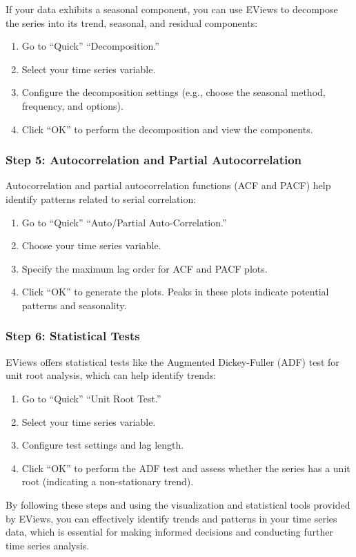 \documentclass[
  letterpaper,
  DIV=11,
  numbers=noendperiod]{scrartcl}
\begin{document}
If your data exhibits a seasonal component, you can use EViews to
decompose the series into its trend, seasonal, and residual components:

\begin{enumerate}
\def\labelenumi{\arabic{enumi}.}
\item
  Go to ``Quick'' ``Decomposition.''
\item
  Select your time series variable.
\item
  Configure the decomposition settings (e.g., choose the seasonal
  method, frequency, and options).
\item
  Click ``OK'' to perform the decomposition and view the components.
\end{enumerate}

\hypertarget{step-5-autocorrelation-and-partial-autocorrelation}{%
\subsubsection{\texorpdfstring{\textbf{Step 5: Autocorrelation and
Partial
Autocorrelation}}{Step 5: Autocorrelation and Partial Autocorrelation}}\label{step-5-autocorrelation-and-partial-autocorrelation}}

Autocorrelation and partial autocorrelation functions (ACF and PACF)
help identify patterns related to serial correlation:

\begin{enumerate}
\def\labelenumi{\arabic{enumi}.}
\item
  Go to ``Quick'' ``Auto/Partial Auto-Correlation.''
\item
  Choose your time series variable.
\item
  Specify the maximum lag order for ACF and PACF plots.
\item
  Click ``OK'' to generate the plots. Peaks in these plots indicate
  potential patterns and seasonality.
\end{enumerate}

\hypertarget{step-6-statistical-tests}{%
\subsubsection{\texorpdfstring{\textbf{Step 6: Statistical
Tests}}{Step 6: Statistical Tests}}\label{step-6-statistical-tests}}

EViews offers statistical tests like the Augmented Dickey-Fuller (ADF)
test for unit root analysis, which can help identify trends:

\begin{enumerate}
\def\labelenumi{\arabic{enumi}.}
\item
  Go to ``Quick'' ``Unit Root Test.''
\item
  Select your time series variable.
\item
  Configure test settings and lag length.
\item
  Click ``OK'' to perform the ADF test and assess whether the series has
  a unit root (indicating a non-stationary trend).
\end{enumerate}

By following these steps and using the visualization and statistical
tools provided by EViews, you can effectively identify trends and
patterns in your time series data, which is essential for making
informed decisions and conducting further time series analysis.
\end{document}
